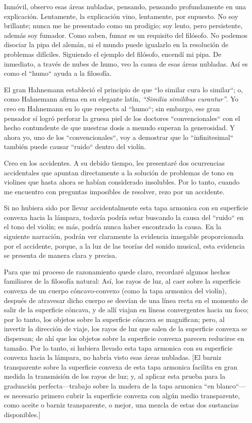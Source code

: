 \documentclass[12pt]{book}
\begin{document}
Inmóvil, observo esas áreas nubladas, pensando, pensando profundamente en una explicación. Lentamente, la explicación vino, lentamente, por supuesto. No soy brillante; nunca me he presentado como un prodigio; soy lento, pero persistente, además soy fumador. Como saben, fumar es un requisito del filósofo. No podemos disociar la pipa del alemán, ni el mundo puede igualarlo en la resolución de problemas difíciles. Siguiendo el ejemplo del filósofo, encendí mi pipa. De inmediato, a través de nubes de humo, veo la causa de esas áreas nubladas. Así es como el ``humo`` ayuda a la filosofía.

El gran Hahnemann estableció el principio de que ``lo similar cura lo similar``; o, como Hahnemann afirma en su elegante latín, \textit{“Similia similibus curantur”}. Yo creo en Hahnemann en lo que respecta al ``humo``; sin embargo, ese gran pensador sí logró perforar la gruesa piel de los doctores ``convencionales`` con el hecho contundente de que nuestras dosis a menudo superan la generosidad. Y ahora yo, uno de los ``convencionales``, voy a demostrar que lo ``infinitesimal`` también puede causar ``ruido`` dentro del violín.

Creo en los accidentes. A su debido tiempo, les presentaré dos ocurrencias accidentales que apuntan directamente a la solución de problemas de tono en violines que hasta ahora se habían considerado insolubles. Por lo tanto, cuando me encuentro con preguntas imposibles de resolver, rezo por un accidente.

Si no hubiera sido por llevar accidentalmente esta tapa armonica con su superficie convexa hacia la lámpara, todavía podría estar buscando la causa del ``ruido`` en el tono del violín; es más, podría nunca haber encontrado la causa. En la siguiente narración, podrán ver claramente la evidencia innegable proporcionada por el accidente, porque, a la luz de las teorías del sonido musical, esta evidencia se presenta de manera clara y precisa.

Para que mi proceso de razonamiento quede claro, recordaré algunos hechos familiares de la filosofía natural: Así, los rayos de luz, al caer sobre la superficie convexa de un cuerpo cóncavo-convexo (como la tapa armonica del violín), después de atravesar dicho cuerpo se desvían de una línea recta en el momento de salir de la superficie cóncava, y de allí viajan en líneas convergentes hacia un foco; por lo tanto, los objetos sobre la superficie cóncava se magnifican; pero, al invertir la dirección de viaje, los rayos de luz que salen de la superficie convexa se dispersan; de ahí que los objetos sobre la superficie convexa parecen reducirse en tamaño. Por lo tanto, si hubiera llevado esta tapa armonica con su superficie convexa hacia la lámpara, no habría visto esas áreas nubladas. [El barniz transparente sobre la superficie convexa de esta tapa armonica facilita en gran medida la transmisión de los rayos de luz; y, al aplicar esta prueba para la graduación perfecta—trabajo sobre la madera de la tapa armonica ``en blanco``—es necesario primero cubrir la superficie convexa con algún medio transparente, como aceite o barniz transparente, o mejor, una mezcla de estas dos sustancias disponibles.]
\end{document}
